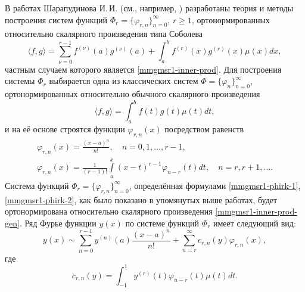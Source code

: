В работах Шарапудинова И.\,И. (см., например, \cite{mmgmsr1-Sha18, mmgmsr1-Shii-Shti-izvvuzov2017, mmgmsr1-Shii-matzam2017, mmgmsr1-ShaGadGad16, mmgmsr1-ShaGad16, mmgmsr1-Shii-lag-demi2015, mmgmsr1-SHII-MMG-Demi2015}) разработаны теория и методы построения систем функций $\Phi_r=\{\varphi_{r,n}\}_{n=0}^\infty$, $r \ge 1$, ортонормированных относительно скалярного произведения типа Соболева
\begin{equation}\label{mmgmsr1-inner-prod-gen}
\langle f,g \rangle =
\sum_{\nu=0}^{r-1}f^{(\nu)}(a)g^{(\nu)}(a)+\int_{a}^{b}f^{(r)}(x)g^{(r)}(x)\mu(x)dx,
\end{equation}
частным случаем которого является \eqref{mmgmsr1-inner-prod}. Для построения системы $\Phi_r$ выбирается одна из классических систем $\Phi =\{\varphi_n\}_{n=0}^\infty$, ортонормированных относительно обычного скалярного произведения
\begin{equation}\label{mmgmsr1-classic-mul}
\langle f,g \rangle =\int_{a}^{b}f(t)g(t)\mu(t)dt,
\end{equation}
и на её основе строятся функции $\varphi_{r,n}(x)$ посредством равенств
\begin{gather}
\label{mmgmsr1-phirk-1}
\varphi_{r,n}(x) =\frac{(x-a)^n}{n!}, \quad n=0,1,\ldots, r-1,\\
\label{mmgmsr1-phirk-2}
\varphi_{r,n}(x) =\frac{1}{(r-1)!}\int\limits_{a}^x(x-t)^{r-1}\varphi_{n-r}(t)dt, \quad n=r,r+1,\ldots.
\end{gather}
Система функций $\Phi_r=\{\varphi_{r,n}\}_{n=0}^\infty$, определённая формулами \eqref{mmgmsr1-phirk-1}, \eqref{mmgmsr1-phirk-2}, как было показано в упомянутых выше работах, будет ортонормирована относительно скалярного произведения \eqref{mmgmsr1-inner-prod-gen}.
Ряд Фурье функции $y(x)$ по системе функций $\Phi_r$ имеет следующий вид:
\begin{equation}\label{mmgmsr1-fourier-series}
y(x) \sim \sum_{n=0}^{r-1} y^{(n)}(a)\frac{(x-a)^n}{n!}+ \sum_{n=r}^\infty c_{r,n}(y) \varphi_{r,n}(x),
\end{equation}
где
\begin{equation}\label{mmgmsr1-crk}
c_{r,n}(y)=\int_{-1}^1 y^{(r)}(t)\varphi_{n-r}(t)\mu(t)dt.
\end{equation}

